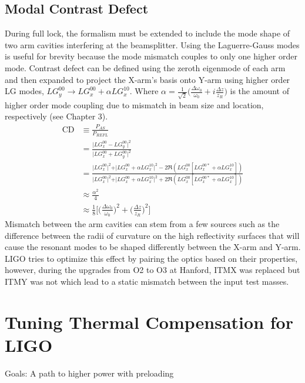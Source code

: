 	\subsection{Modal Contrast Defect}
	During full lock, the formalism must be extended to include the mode shape of two arm cavities interfering at the beamsplitter. Using the Laguerre-Gauss modes is useful for brevity because the mode mismatch couples to only one higher order mode. Contrast defect can be defined using the zeroth eigenmode of each arm and then expanded to project the X-arm's basis onto Y-arm using higher order LG modes, $LG^{00}_y \rightarrow  LG^{00}_x + \alpha LG^{10}_x$.  Where $\alpha = \frac{1}{\sqrt{2}} \big(\frac{\Delta \omega_{0}}{\omega_{0}} + i \frac{\Delta z }{z_R}\big)$ is the amount of higher order mode coupling due to mismatch in beam size and location, respectively (see Chapter 3).
	\begin{equation}\label{CD_mode}
	\begin{aligned}
	\text{CD} 	&\equiv \frac{P_{AS}}{P_{REFL}} \\
	&= \frac{\vert LG^{00}_x - LG^{00}_y \vert^2}{\vert LG^{00}_x + LG^{00}_y \vert^2}\\
	&= \frac{\vert LG^{00}_x \vert^2 + \vert LG^{00}_x + \alpha LG^{10}_x \vert^2 - 2\Re(LG^{00}_x [LG^{00*}_x + \alpha LG^{10}_x ])}{\vert LG^{00}_x \vert^2 + \vert LG^{00}_x + \alpha LG^{10}_x \vert^2 + 2\Re(LG^{00}_x [LG^{00*}_x + \alpha LG^{10}_x ])}\\
	&\approx \frac{\alpha^2}{4}\\
	&\approx \frac{1}{8} \bigg[ \bigg(\frac{\Delta\omega_{0}}{\omega_{0}} \bigg)^2+  \bigg(\frac{ \Delta z }{z_R}\bigg)^2 \bigg]
	\end{aligned}
	\end{equation}
	Mismatch between the arm cavities can stem from a few sources such as the difference between the radii of curvature on the high reflectivity surfaces that will cause the resonant modes to be shaped differently between the X-arm and Y-arm. LIGO tries to optimize this effect by pairing the optics based on their properties, however, during the upgrades from O2 to O3 at Hanford, ITMX was replaced but ITMY was not which lead to a static mismatch between the input test masses.
	
	\section{Tuning Thermal Compensation for LIGO}
	Goals: A path to higher power with preloading \cite{winkler_thermaldist} \cite{Strain_TL}
	

